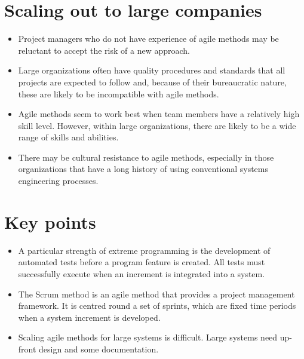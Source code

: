 \section{ Scaling out to large companies}
\begin{itemize}
\item Project managers who do not have experience of agile methods may be reluctant to accept the risk of a new approach.

\item Large organizations often have quality procedures and standards that all projects are expected to follow and, because of their bureaucratic nature, these are likely to be incompatible with agile methods.

\item Agile methods seem to work best when team members have a relatively high skill level. However, within large organizations, there are likely to be a wide range of skills and abilities.

\item There may be cultural resistance to agile methods, especially in those organizations that have a long history of using conventional systems engineering processes.

\end{itemize}
\section{ Key points}
\begin{itemize}

\item A particular strength of extreme programming is the development of automated tests before a program feature is created. All tests must successfully execute when an increment is integrated into a system.

\item The Scrum method is an agile method that provides a project management framework. It is centred round a set of sprints, which are fixed time periods when a system increment is developed.

\item Scaling agile methods for large systems is difficult. Large systems need up-front design and some documentation.
\end{itemize}
